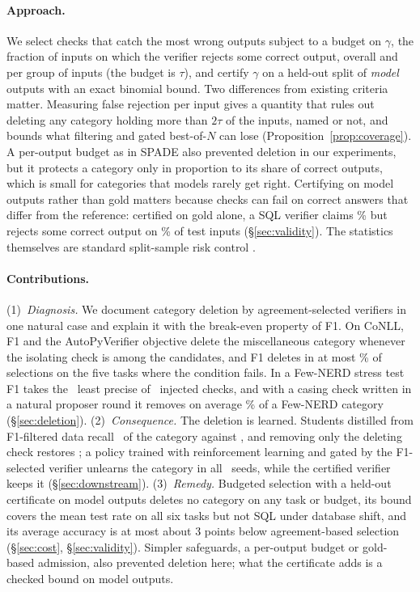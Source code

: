 \documentclass[11pt]{article}
\begin{document}
\paragraph{Approach.} We select checks that catch the most wrong outputs
subject to a budget on $\gamma$, the fraction of inputs on which the
verifier rejects some correct output, overall and per group of inputs
(the budget is $\tau$), and certify $\gamma$ on a held-out split of \emph{model} outputs with an exact
binomial bound. Two differences from existing criteria matter. Measuring
false rejection per input gives a quantity that rules out deleting any
category holding more than $2\tau$ of the inputs, named or not, and bounds
what filtering and gated best-of-$N$ can lose
(Proposition~\ref{prop:coverage}). A per-output budget as in SPADE also
prevented deletion in our experiments, but it protects a category only in
proportion to its share of correct outputs, which is small for
categories that models rarely get right.
Certifying on model outputs rather than gold matters because checks can
fail on correct answers that differ from the reference: certified on gold
alone, a SQL verifier claims \ablGoldClaimSQL\% but rejects some correct
output on \rtGoldOnlyTestGammaSQL\% of test inputs (\S\ref{sec:validity}). The statistics themselves are
standard split-sample risk control \citep{angelopoulos2021ltt}.

\paragraph{Contributions.}
(1)~\emph{Diagnosis.} We document category deletion by agreement-selected
verifiers in one natural case and explain it with the break-even property
of F1. On CoNLL, F1
and the AutoPyVerifier objective delete the miscellaneous category whenever
the isolating check is among the candidates, and F1 deletes in at most
\delRateFoneMaxOther\% of selections on the five tasks where the condition
fails. In a Few-NERD stress test F1 takes the \injNPicked\ least precise of
\injNFewnerd\ injected checks, and with a casing check written in a natural
proposer round it removes on average \eOtherFone\% of a Few-NERD category
(\S\ref{sec:deletion}).
(2)~\emph{Consequence.} The deletion is learned. Students distilled from
F1-filtered data recall \dsRecFone\ of the category against \dsRecCert, and
removing only the deleting check restores \ablDelRec; a policy trained with
reinforcement learning and gated by the F1-selected verifier unlearns the
category in all \rlNFone\ seeds, while the certified verifier keeps it
(\S\ref{sec:downstream}).
(3)~\emph{Remedy.} Budgeted selection with a held-out certificate on model
outputs deletes no category on any task or budget, its bound covers the
mean test rate on all six tasks but not SQL under database shift, and its
average accuracy is at most about 3 points below agreement-based selection
(\S\ref{sec:cost}, \S\ref{sec:validity}). Simpler safeguards, a
per-output budget or gold-based admission, also prevented deletion here;
what the certificate adds is a checked bound on model outputs.
\end{document}
